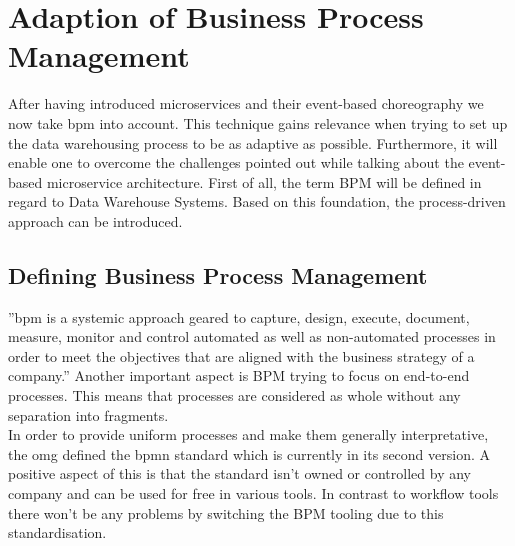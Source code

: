 \section{Adaption of Business Process Management}
\label{sec:bpm}
After having introduced microservices and their event-based choreography we now take \acrfull{bpm} into account. This technique gains relevance when trying to set up the data warehousing process to be as adaptive as possible. Furthermore, it will enable one to overcome the challenges pointed out while talking about the event-based microservice architecture.\newline
First of all, the term BPM will be defined in regard to Data Warehouse Systems. Based on this foundation, the process-driven approach can be introduced. 

\subsection{Defining Business Process Management}
''\acrfull{bpm} is a systemic approach geared to capture, design, execute, document, measure, monitor and control automated as well as non-automated processes in order to meet the objectives that are aligned with the business strategy of a company.'' \cite{bpmDef} Another important aspect is BPM trying to focus on end-to-end processes. This means that processes are considered as whole without any separation into fragments. \cite{praxisBPM}\newline
\\
In order to provide uniform processes and make them generally interpretative, the \acrfull{omg} defined the \acrfull{bpmn} standard which is currently in its second version. A positive aspect of this is that the standard isn't owned or controlled by any company and can be used for free in various tools. In contrast to workflow tools there won't be any problems by switching the BPM tooling due to this standardisation. \cite{bpmMethodStyle}

